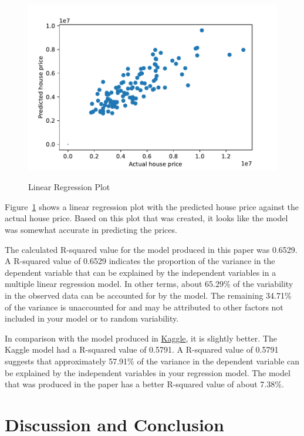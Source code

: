 \documentclass[12pt]{article}
\begin{document}
\begin{figure}[h!]
    \caption{Linear Regression Plot}
    \includegraphics[width=1\textwidth]{linear_regression_plot.pdf}
    \label{fig:regression_plot}
\end{figure}
Figure~\ref{fig:regression_plot} shows a linear regression plot with the predicted house price against the actual house price. Based on this plot that was created, it looks like the model was somewhat accurate in predicting the prices. 

The calculated R-squared value for the model produced in this paper was 0.6529. A R-squared value of 0.6529 indicates the proportion of the variance in the dependent variable that can be explained by the independent variables in a multiple linear regression model. In other terms, about 65.29\% of the variability in the observed data can be accounted for by the model. The remaining 34.71\% of the variance is unaccounted for and may be attributed to other factors not included in your model or to random variability.

In comparison with the model produced in \href{https://www.kaggle.com/code/ashydv/housing-price-prediction-linear-regression/notebook}{Kaggle}, it is slightly better. The Kaggle model had a R-squared value of 0.5791. A R-squared value of 0.5791 suggests that approximately 57.91\% of the variance in the dependent variable can be explained by the independent variables in your regression model. The model that was produced in the paper has a better R-squared value of about 7.38\%. 

\section{Discussion and Conclusion}
\label{sec:disc}
\end{document}
